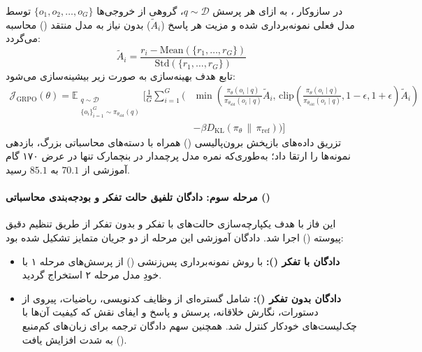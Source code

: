در سازوکار ، به ازای هر پرسش $q \sim \mathcal{D}$، گروهی از خروجی‌ها $\{o_1, o_2, \dots, o_G\}$ توسط مدل فعلی نمونه‌برداری شده و مزیت هر پاسخ ($\tilde{A}_i$) بدون نیاز به مدل منتقد () محاسبه می‌گردد:
\begin{equation}
    \tilde{A}_i = \frac{r_i - \text{Mean}(\{r_1, \dots, r_G\})}{\text{Std}(\{r_1, \dots, r_G\})}
\end{equation}
تابع هدف بهینه‌سازی به صورت زیر بیشینه‌سازی می‌شود:
\begin{equation}
\begin{aligned}
    \mathcal{J}_{\text{GRPO}}(\theta) = \mathbb{E}_{\substack{q \sim \mathcal{D} \\ \{o_i\}_{i=1}^G \sim \pi_{\theta_{\text{old}}}(q)}} \Bigg[ \frac{1}{G} \sum_{i=1}^G \Bigg( &\min \left( \frac{\pi_\theta(o_i \mid q)}{\pi_{\theta_{\text{old}}}(o_i \mid q)} \tilde{A}_i, \, \text{clip}\left(\frac{\pi_\theta(o_i \mid q)}{\pi_{\theta_{\text{old}}}(o_i \mid q)}, 1-\epsilon, 1+\epsilon\right) \tilde{A}_i \right) \\
    &- \beta D_{\text{KL}}(\pi_\theta \,\|\, \pi_{\text{ref}}) \Bigg) \Bigg]
\end{aligned}
\end{equation}
تزریق داده‌های بازپخش برون‌پالیسی () همراه با دسته‌های محاسباتی بزرگ، بازدهی نمونه‌ها را ارتقا داد؛ به‌طوری‌که نمره مدل پرچمدار  در بنچمارک  تنها در عرض ۱۷۰ گام آموزشی از $70.1$ به $85.1$ رسید.

\paragraph*{مرحله سوم: دادگان تلفیق حالت تفکر و بودجه‌بندی محاسباتی ()}
این فاز با هدف یکپارچه‌سازی حالت‌های با تفکر و بدون تفکر از طریق تنظیم دقیق پیوسته () اجرا شد. دادگان آموزشی این مرحله از دو جریان متمایز تشکیل شده بود:
\begin{itemize}
    \item \textbf{دادگان با تفکر ():} با روش نمونه‌برداری پس‌زنشی () از پرسش‌های مرحله ۱ با خودِ مدل مرحله ۲ استخراج گردید.
    \item \textbf{دادگان بدون تفکر ():} شامل گستره‌ای از وظایف کدنویسی، ریاضیات، پیروی از دستورات، نگارش خلاقانه، پرسش و پاسخ و ایفای نقش که کیفیت آن‌ها با چک‌لیست‌های خودکار کنترل شد. همچنین سهم دادگان ترجمه برای زبان‌های کم‌منبع () به شدت افزایش یافت.
\end{itemize}

